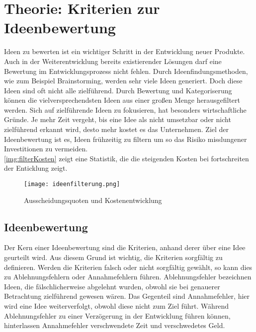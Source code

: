 \newpage
\section{Theorie: Kriterien zur Ideenbewertung}\label{sec:theorie}
Ideen zu bewerten ist ein wichtiger Schritt in der Entwicklung neuer Produkte. 
Auch in der Weiterentwicklung bereits existierender Lösungen darf eine Bewertung im Entwicklungsprozess nicht fehlen. 
Durch Ideenfindungsmethoden, wie zum Beispiel Brainstorming, werden sehr viele Ideen generiert. Doch diese Ideen 
sind oft nicht alle zielführend. 
Durch Bewertung und Kategoriserung können die vielversprechendsten Ideen aus einer großen Menge herausgefiltert werden. 
Sich auf zielführende Ideen zu fokusieren, hat besonders wirtschaftliche Gründe.
Je mehr Zeit vergeht, bis eine Idee als nicht umsetzbar oder nicht zielführend erkannt wird, desto mehr kostet es das Unternehmen.
Ziel der Ideenbewertung ist es, Ideen frühzeitig zu filtern um so das Risiko misslungener Investitionen zu vermeiden.
\cite{grossklaus:2008}\\
\autoref{img:filterKosten} zeigt eine Statistik, die die steigenden Kosten bei fortschreiten der Enticklung zeigt. 
\begin{figure}[h]
	\centering
	\texttt{[image: ideenfilterung.png]}
	\caption{Ausscheidungsquoten und Kostenentwicklung}
	\label{img:filterKosten}
\end{figure}

\subsection{Ideenbewertung}
Der Kern einer Ideenbewertung sind die Kriterien, anhand derer über eine Idee geurteilt wird.
Aus diesem Grund ist wichtig, die Kriterien sorgfältig zu definieren. Werden die Kriterien falsch oder nicht sorgfältig gewählt,
so kann dies zu Ablehnungsfehlern oder Annahmefehlern führen. 
Ablehnungsfehler bezeichnen Ideen, die fälschlicherweise abgelehnt wurden, obwohl sie bei genauerer Betrachtung 
zielführend gewesen wären. Das Gegenteil sind Annahmefehler, hier wird eine Idee weiterverfolgt, obwohl diese nicht zum Ziel führt. 
Während Ablehnungsfehler zu einer Verzögerung in der Entwicklung führen können, hinterlassen Annahmefehler verschwendete Zeit und verschwedetes Geld.\\

